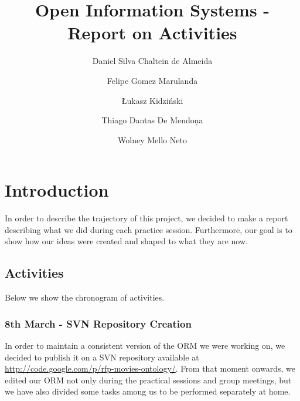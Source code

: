 \documentclass[a4paper,10pt]{article}
\title{Open Information Systems - Report on Activities}
\author{Daniel Silva Chaltein de Almeida
\and Felipe Gomez Marulanda
\and \L{}ukasz Kidzi\'nski
\and Thiago Dantas De Mendon\c{}a
\and Wolney Mello Neto}
\begin{document}
\maketitle

\section{Introduction}
In order to describe the trajectory of this project, we decided to make a report describing what we did during each practice session. Furthermore, our goal is to show how our ideas were created and shaped to what they are now.

\subsection{Activities}
Below we show the chronogram of activities.

\subsubsection*{8th March - SVN Repository Creation}
In order to maintain a consistent version of the ORM we were working on, we decided to publish it on a SVN repository available at \href{http://code.google.com/p/rfp-movies-ontology/}{http://code.google.com/p/rfp-movies-ontology/}. From that moment onwards, we edited our ORM not only during the practical sessions and group meetings, but we have also divided some tasks among us to be performed separately at home.
\end{document}
